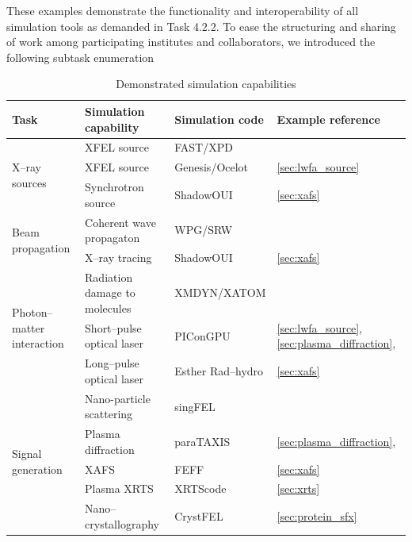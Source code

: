\documentclass[12pt]{scrartcl}
\begin{document}
These examples demonstrate the functionality and interoperability of all
simulation tools as demanded in Task 4.2.2. To ease the structuring and
sharing of work among participating institutes and collaborators, we introduced the following subtask enumeration

\begin{table}
  \begin{center}
    \scriptsize
    \caption{Demonstrated simulation capabilities}
    \label{tab:simulation_capabilities}
  \begin{tabular}[ht]{|l|l|l|l|}
    \hline
      \textbf{Task} &
      \textbf{Simulation capability} &
      \textbf{Simulation code}     &
      \textbf{Example reference}    \\
    \hline
    \hline
      \multirow{3}{*}{X--ray sources}
      & XFEL source                     & FAST/XPD              & \cite{EUCALL_SIMEX_M4.1,EUCALL_SIMEX_M4.2,Fortmann-Grote2017}     \\
      & XFEL source                     & Genesis/Ocelot        & \ref{sec:lwfa_source} \\
      & Synchrotron source              & ShadowOUI             & \ref{sec:xafs}       \\
    \hline
    \multirow{2}{*}{Beam propagation}
      & Coherent wave propagaton        & WPG/SRW               & \cite{EUCALL_SIMEX_M4.1,EUCALL_SIMEX_M4.2,Fortmann-Grote2017}     \\
      & X--ray tracing                  & ShadowOUI             & \ref{sec:xafs}       \\
    \hline
    \multirow{3}{*}{Photon--matter interaction}
      & Radiation damage to molecules   & XMDYN/XATOM           & \cite{EUCALL_SIMEX_M4.1,EUCALL_SIMEX_M4.2,Fortmann-Grote2017}     \\
      & Short--pulse optical laser      & PIConGPU              & \ref{sec:lwfa_source},\ref{sec:plasma_diffraction},\cite{EUCALL_SIMEX_D4.1}  \\
      & Long--pulse optical laser       & Esther Rad--hydro     & \ref{sec:xafs} \cite{Torchio2016}  \\
    \hline
    \multirow{5}{*}{Signal generation}
      & Nano-particle scattering        & singFEL               & \cite{EUCALL_SIMEX_M4.1,EUCALL_SIMEX_M4.2,Fortmann-Grote2017}     \\

      & Plasma diffraction              & paraTAXIS             &
      \ref{sec:plasma_diffraction},\cite{EUCALL_SIMEX_D4.1,Kluge2016, Garten2017}  \\
      & XAFS                            & FEFF                  & \ref{sec:xafs} \cite{EUCALL_SIMEX_D4.2,Torchio2016}  \\
      & Plasma XRTS                     & XRTScode              & \ref{sec:xrts} \cite{Fortmann2009d}               \\
      & Nano--crystallography           & CrystFEL              & \ref{sec:protein_sfx}         \\
    \hline
  \end{tabular}
  \end{center}
\end{table}
\end{document}
